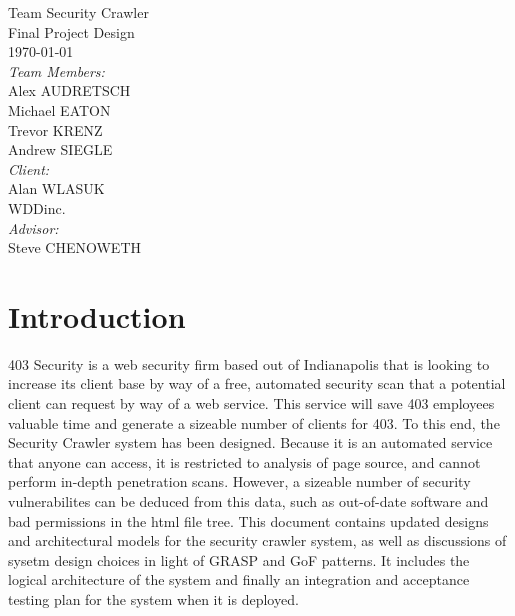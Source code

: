 \documentclass{article}
\begin{document}
\fancyhf{}
\rhead{\today}

\begin{titlepage}
\begin{center}
{\huge Team Security Crawler}\\[2cm]
{\Large Final Project Design}\\[2cm]
{\large \today}\\[2cm]
\emph{Team Members:}\\
Alex \uppercase{Audretsch}\\
Michael \uppercase{Eaton}\\
Trevor \uppercase{Krenz}\\
Andrew \uppercase{Siegle}\\[1cm]
\emph{Client:}\\
Alan WLASUK\\
WDDinc.\\[1cm]
\emph{Advisor:}\\
Steve CHENOWETH

\end{center}
\end{titlepage}
\tableofcontents
\newpage
\section{Introduction}
403 Security is a web security firm based out of Indianapolis that is looking to increase its client base by way of a free, automated security scan that a potential client can request by way of a web service.  This service will save 403 employees valuable time and generate a sizeable number of clients for 403.
To this end, the Security Crawler system has been designed.  Because it is an automated service that anyone can access, it is restricted to analysis of page source, and cannot perform in-depth penetration scans.  However, a sizeable number of security vulnerabilites can be deduced from this data, such as out-of-date software and bad permissions in the html file tree.
This document contains updated designs and architectural models for the security crawler system, as well as discussions of sysetm design choices in light of GRASP and GoF patterns.  It includes the logical architecture of the system and finally an integration and acceptance testing plan for the system when it is deployed.

\newpage
\end{document}
